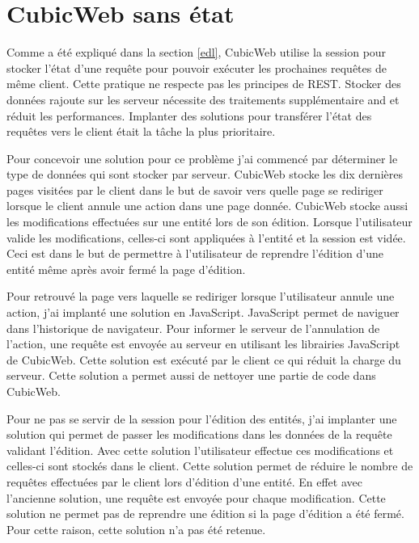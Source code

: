 \section{CubicWeb sans état}
Comme a été expliqué dans la section \ref{edl}, CubicWeb utilise la session pour stocker l'état d'une requête pour pouvoir exécuter les prochaines requêtes de même client. Cette pratique ne respecte pas les principes de REST. Stocker des données rajoute sur les serveur nécessite des traitements supplémentaire and et réduit les performances. Implanter des solutions pour transférer l'état des requêtes vers le client était la tâche la plus prioritaire.

Pour concevoir une solution pour ce problème j'ai commencé par déterminer le type de données qui sont stocker par serveur. CubicWeb stocke les dix dernières pages visitées par le client dans le but de savoir vers quelle page se rediriger lorsque le client annule une action dans une page donnée. CubicWeb stocke aussi les modifications effectuées sur une entité lors de son édition. Lorsque l'utilisateur valide les modifications, celles-ci sont appliquées à l'entité et la session est vidée. Ceci est dans le but de permettre à l'utilisateur de reprendre l'édition d'une entité même après avoir fermé la page d'édition. 

Pour retrouvé la page vers laquelle se rediriger lorsque l'utilisateur annule une action, j'ai implanté une solution en JavaScript. JavaScript permet de naviguer dans l'historique de navigateur. Pour informer le serveur de l'annulation de l'action, une requête  est envoyée au serveur en utilisant les librairies JavaScript de CubicWeb. Cette solution est exécuté par le client ce qui réduit la charge du serveur. Cette solution a permet aussi de nettoyer une partie de code dans CubicWeb.

Pour ne pas se servir de la session pour l'édition des entités, j'ai implanter une solution qui permet de passer les modifications dans les données de la requête validant l'édition. Avec cette solution l'utilisateur effectue ces modifications et celles-ci sont stockés dans le client. Cette solution permet de réduire le nombre de requêtes effectuées par le client lors d'édition d'une entité. En effet avec l'ancienne solution, une requête est envoyée pour chaque modification. Cette solution ne permet pas de reprendre une édition si la page d'édition a été fermé. Pour cette raison, cette solution n'a pas été retenue.

